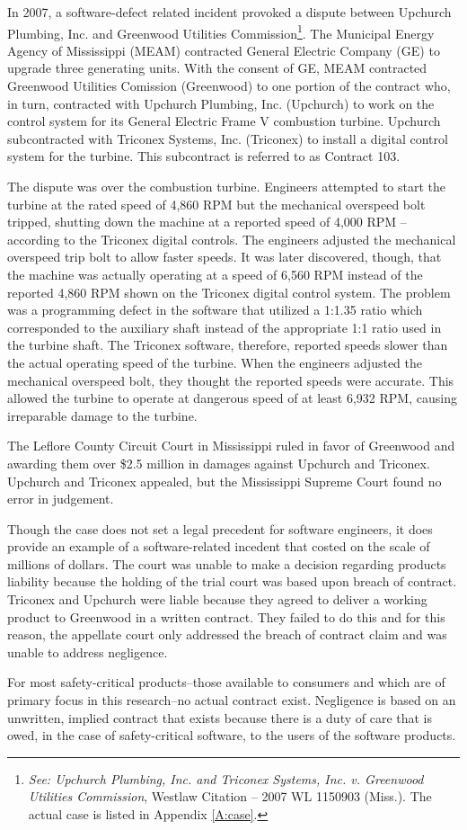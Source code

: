 In 2007, a software-defect related incident provoked a dispute between Upchurch
Plumbing, Inc. and Greenwood Utilities Commission\footnote{\textit{See: Upchurch
Plumbing, Inc. and Triconex Systems, Inc. v. Greenwood Utilities
Commission}, Westlaw Citation -- 2007 WL 1150903 (Miss.). The actual case is
listed in Appendix \ref{A:case}.}. The Municipal Energy
Agency of Mississippi (MEAM) contracted General Electric Company (GE) to upgrade
three generating units. With the consent of GE, MEAM contracted Greenwood
Utilities Comission (Greenwood) to one portion of the contract who, in turn,
contracted with Upchurch Plumbing, Inc. (Upchurch) to work on the control system
for its General Electric Frame V combustion turbine. Upchurch subcontracted with
Triconex Systems, Inc. (Triconex) to install a digital control system for the
turbine. This subcontract is referred to as Contract 103.

The dispute was over the combustion turbine. Engineers attempted to start the
turbine at the rated speed of 4,860 RPM but the mechanical overspeed bolt
tripped, shutting down the machine at a reported speed of 4,000 RPM -- according
to the Triconex digital controls. The engineers adjusted the mechanical  
overspeed trip bolt to allow faster speeds. It was later discovered, though,
that the machine was actually operating at a speed of 6,560 RPM instead of the
reported 4,860 RPM shown on the Triconex digital control system. The problem was
a programming defect in the software that utilized a 1:1.35 ratio which
corresponded to the auxiliary shaft instead of the appropriate 1:1 ratio used in
the turbine shaft. The Triconex software, therefore, reported speeds slower than
the actual operating speed of the turbine. When the engineers adjusted the
mechanical overspeed bolt, they thought the reported speeds were accurate. This
allowed the turbine to operate at dangerous speed of at least 6,932 RPM, causing
irreparable damage to the turbine.

The Leflore County Circuit Court in Mississippi ruled in favor of Greenwood and
awarding them over \$2.5 million in damages against Upchurch and Triconex.
Upchurch and Triconex appealed, but the Mississippi Supreme Court found no error
in judgement.

Though the case does not set a legal precedent for software engineers, it does
provide an example of a software-related incedent that costed on the scale of
millions of dollars. The court was unable to make a decision regarding products
liability because the holding of the trial court was based upon breach of
contract. Triconex and Upchurch were liable because they agreed to deliver a
working product to Greenwood in a written contract. They failed to do this and 
for this reason, the appellate court only addressed the breach of contract claim
and was unable to address negligence.

For most safety-critical products--those available to consumers and which are of
primary focus in this research--no actual contract exist. Negligence is based on
an unwritten, implied contract that exists because there is a duty of care that
is owed, in the case of safety-critical software, to the users of the software
products.
